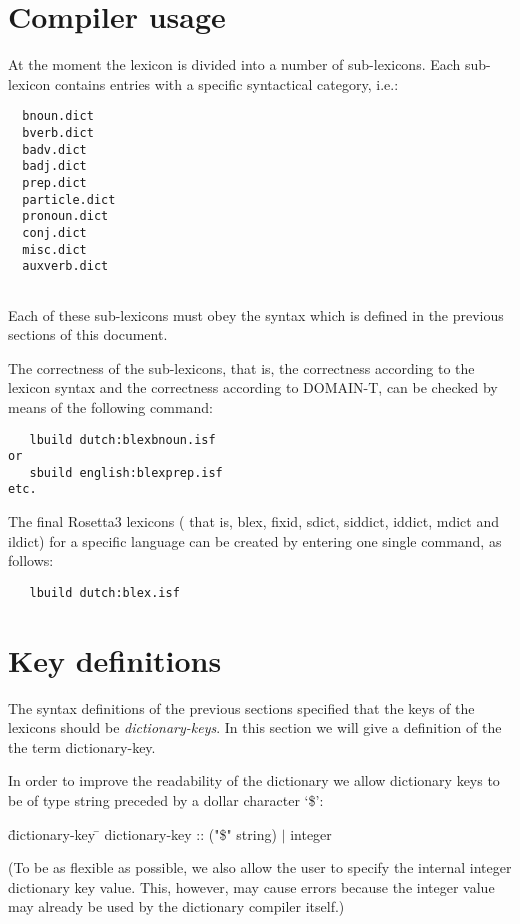 \section { Compiler usage }

At the moment the lexicon is divided into a number of sub-lexicons. Each
sub-lexicon contains entries with a specific syntactical category, i.e.:

\begin{verbatim}
  bnoun.dict
  bverb.dict
  badv.dict
  badj.dict
  prep.dict
  particle.dict
  pronoun.dict
  conj.dict
  misc.dict
  auxverb.dict
  
\end{verbatim}

Each of these sub-lexicons must obey the syntax which is defined in the previous
sections of this document.

The correctness of the sub-lexicons, that is, the correctness according to
the lexicon syntax and the correctness according to DOMAIN-T, can be checked
by means of the following command:

\begin{verbatim}
   lbuild dutch:blexbnoun.isf
or
   sbuild english:blexprep.isf
etc.
\end{verbatim}

The final Rosetta3 lexicons ( that is, blex, fixid, sdict, siddict, iddict, 
mdict and 
ildict) for a specific language can be created by entering one single command, 
as follows:

\begin{verbatim}
   lbuild dutch:blex.isf
\end{verbatim}

\section{Key definitions}

The syntax definitions of the previous sections specified that the keys
of the lexicons should be {\em dictionary-keys}. In this section we will give
a definition of the the term dictionary-key.

In order to improve the readability of the dictionary we allow dictionary keys
to be of type string preceded by a dollar character `\$':
\begin {tabbing}
   \= dictionary-key \= \kill
   \> dictionary-key \> :: ("\$" string) $\mid$ integer \\
\end {tabbing}
(To be as flexible as possible, we also allow the user to specify the internal
integer dictionary key value. This, however, may cause errors because the
integer value may already be used by the dictionary compiler itself.)

